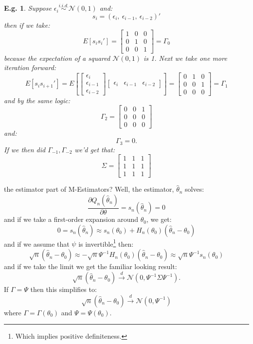 \documentclass{tufte-book}
\theoremstyle{mytheoremstyle}
\theoremstyle{mylemstyle}
\theoremstyle{mydefstyle}
\newtheorem*{ex}{E.g.}
\begin{document}
\begin{ex} Suppose \(\epsilon_i \overset{i.i.d.}{\sim} \mathcal{N}(0, 1)\) and:
	\[s_i = (\epsilon_i,\ \epsilon_{i-1},\ \epsilon_{i-2})'\]
then if we take:
	\[E[s_i s_i']= \left[\begin{array}{ccc} 1 & 0 & 0 \\ 0 & 1 & 0 \\ 0 & 0 & 1 \end{array} \right] = \Gamma_0\]
because the expectation of a squared \(\mathcal{N}(0, 1)\) is 1. Next we take one more iteration forward:
	\[E[s_i s_{i+1}'] = E\left[ \left[\begin{array}{c} \epsilon_i \\ \epsilon_{i-1} \\ \epsilon_{i-2} \end{array}\right] \left[ \begin{array}{ccc} \epsilon_i & \epsilon_{i-1} & \epsilon_{i-2} \end{array}\right] \right] = \left[\begin{array}{ccc} 0 & 1 & 0 \\ 0 & 0 & 1 \\ 0 & 0 & 0 \end{array} \right] = \Gamma_1\]
and by the same logic:
	\[\Gamma_2 = \left[\begin{array}{ccc} 0 & 0 & 1 \\ 0 & 0 & 0 \\ 0 & 0 & 0 \end{array} \right]\]
and:
	\[\Gamma_3 = 0 \text{.}\]
If we then did \(\Gamma_{-1}, \Gamma_{-2}\) we'd get that:
	\[\Sigma = \left[\begin{array}{ccc} 1& 1&1 \\ 1& 1& 1 \\ 1& 1&1 \end{array} \right]\]
\end{ex}


 the estimator part of M-Estimators? Well, the estimator, \(\hat{\theta}_n\) solves:
	\[\frac{\partial Q_n(\hat{\theta}_n)}{\partial \theta} = s_n(\hat{\theta}_n) = 0\]
and if we take a first-order expansion around \(\theta_0\), we get:
	\[0 = s_n(\hat{\theta}_n) \approx s_n(\theta_0) + H_n(\theta_0)(\hat{\theta}_n - \theta_0)\]
and if we assume that \(\psi\) is invertible\footnote{Which implies positive definiteness.} then:
	\[\sqrt{n}(\hat{\theta}_n - \theta_0) \approx -\sqrt{n}\Psi^{-1} H_n(\theta_0) (\hat{\theta}_n - \theta_0) \approx \sqrt{n} \Psi^{-1}s_n(\theta_0)\]
and if we take the limit we get the familiar looking result:
	\[\sqrt{n}(\hat{\theta}_n - \theta_0) \overset{d}{\rightarrow} \mathcal{N}(0, \Psi^{-1} \Sigma \Psi^{-1}) \text{.}\]
If \(\Gamma = \Psi\) then this simplifies to:
	\[\sqrt{n}(\hat{\theta}_n - \theta_0) \overset{d}{\rightarrow} \mathcal{N}(0, \Psi^{-1})\]
where \(\Gamma = \Gamma(\theta_0)\) and \(\Psi = \Psi(\theta_0)\). 
\end{document}
